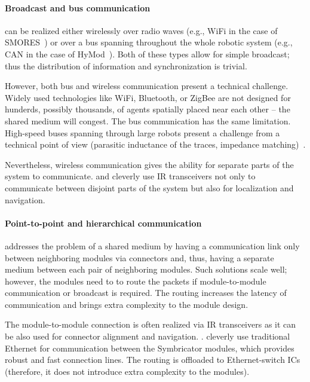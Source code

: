 \paragraph{Broadcast and bus communication} can be realized either
wirelessly over radio waves (e.g., WiFi in the case of
SMORES~\cite{DBLP:conf/iros/DaveyKY12}) or over a bus spanning throughout the
whole robotic system (e.g., CAN in the case of
HyMod~\cite{DBLP:conf/dars/ParrottDG16}). Both of these types allow for simple
broadcast; thus the distribution of information and synchronization is trivial.

However, both bus and wireless communication present a technical challenge.
Widely used technologies like WiFi, Bluetooth, or ZigBee are not designed for
hunderds, possibly thousands, of agents spatially placed near each other -- the
shared medium will congest. The bus communication has the same limitation.
High-speed buses spanning through large robots present a challenge from
a technical point of view (parasitic inductance of the traces, impedance
matching)~\cite{DBLP:conf/dars/ParrottDG16}.

Nevertheless, wireless communication gives the ability for separate parts of
the system to communicate. \textcite{DBLP:conf/iros/YimSSPDT07a} and
\textcite{DBLP:journals/corr/abs-1109-2288} cleverly use IR transceivers not
only to communicate between disjoint parts of the system but also for
localization and navigation.

\paragraph{Point-to-point and hierarchical communication} addresses the problem
of a shared medium by having a communication link only between neighboring
modules via connectors and, thus, having a separate medium between each pair of
neighboring modules. Such solutions scale well; however, the modules need to to
route the packets if module-to-module communication or broadcast is required.
The routing increases the latency of communication and brings extra
complexity to the module design.

The module-to-module connection is often realized via IR transceivers as it can
be also used for connector alignment and navigation.
\cite{DBLP:conf/iros/YimSSPDT07a}. \textcite{DBLP:journals/corr/abs-1109-2288}
cleverly use traditional Ethernet for communication between the Symbricator
modules, which provides robust and fast connection lines. The routing is
offloaded to Ethernet-switch ICs (therefore, it does not introduce extra
complexity to the modules).

